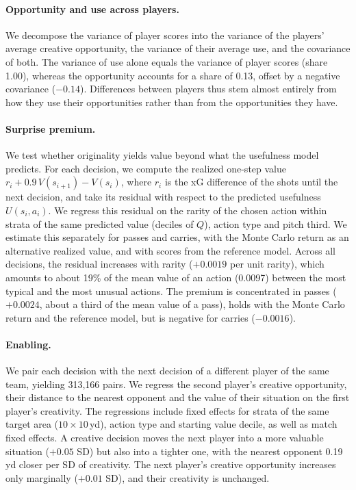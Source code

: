 \paragraph{Opportunity and use across players.} We decompose the variance of player scores into the variance of the
players' average creative opportunity, the variance of their average use, and the covariance of both. The variance of
use alone equals the variance of player scores (share 1.00), whereas the opportunity accounts for a share of 0.13,
offset by a negative covariance ($-0.14$). Differences between players thus stem almost entirely from how they use
their opportunities rather than from the opportunities they have.

\paragraph{Surprise premium.} We test whether originality yields value beyond what the usefulness model predicts. For
each decision, we compute the realized one-step value $r_i + 0.9\, V(s_{i+1}) - V(s_i)$, where $r_i$ is the xG
difference of the shots until the next decision, and take its residual with respect to the predicted usefulness
$U(s_i, a_i)$. We regress this residual on the rarity of the chosen action within strata of the same predicted value
(deciles of $Q$), action type and pitch third. We estimate this separately for passes and carries, with the Monte
Carlo return as an alternative realized value, and with scores from the reference model. Across all decisions, the
residual increases with rarity ($+0.0019$ per unit rarity), which amounts to about 19\% of the mean value of an action
(0.0097) between the most typical and the most unusual actions. The premium is concentrated in passes ($+0.0024$, about a
third of the mean value of a pass), holds with the Monte Carlo return and the reference model, but is negative for
carries ($-0.0016$).

\paragraph{Enabling.} We pair each decision with the next decision of a different player of the same team, yielding
313,166 pairs. We regress the second player's creative opportunity, their distance to the nearest opponent and the
value of their situation on the first player's creativity. The regressions include fixed effects for strata of the
same target area ($10 \times 10$\,yd), action type and starting value decile, as well as match fixed effects. A
creative decision moves the next player into a more valuable situation ($+0.05$ SD) but also into a tighter one, with
the nearest opponent 0.19\,yd closer per SD of creativity. The next player's creative opportunity increases only
marginally ($+0.01$ SD), and their creativity is unchanged.

